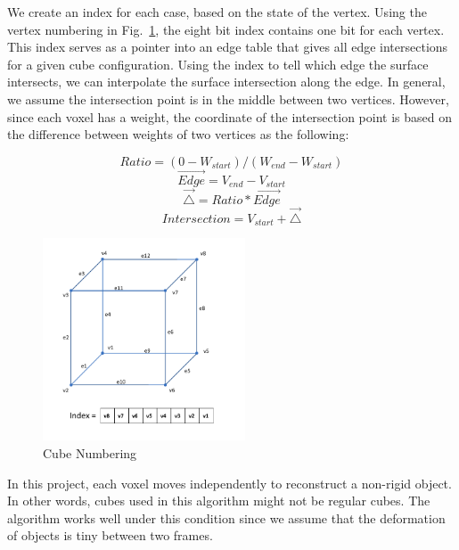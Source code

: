 \documentclass{article}
\begin{document}
We create an index for each case, based on the state of the vertex. Using the vertex numbering in Fig.~\ref{fig:cubenum}, the eight bit index contains one bit for each vertex. This index serves as a pointer into an edge table that gives all edge intersections for a given cube configuration. Using the index to tell which edge the surface intersects, we can interpolate the surface intersection along the edge. In general, we assume the intersection point is in the middle between two vertices. However, since each voxel has a weight, the coordinate of the intersection point is based on the difference between weights of two vertices as the following:

\[Ratio = ( 0 - W_{start} ) / ( W_{end} - W_{start})\]
\[\overrightarrow{Edge} = V_{end}- V_{start}\]
\[\overrightarrow{\triangle} = Ratio * \overrightarrow{Edge}\]
\[Intersection = V_{start} + \overrightarrow{\triangle}\]


\begin{figure}[h]
\centering
\includegraphics[width=6cm]{figures/Cubenum.png}
\caption{Cube Numbering}
\label{fig:cubenum}
\end{figure}

In this project, each voxel moves independently to reconstruct a non-rigid object. In other words, cubes used in this algorithm might not be regular cubes. The algorithm works well under this condition since we assume that the deformation of objects is tiny between two frames.
\end{document}
